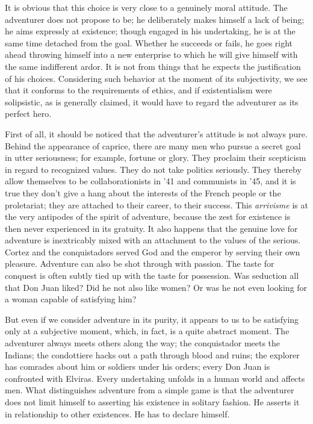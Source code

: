 \documentclass[11pt]{article}
\begin{document}
It is obvious that this choice is very close to a genuinely moral attitude. The adventurer does not propose to be; he deliberately makes himself a lack of being; he aims expressly at existence; though engaged in his undertaking, he is at the same time detached from the goal. Whether he succeeds or fails, he goes right ahead throwing himself into a new enterprise to which he will give himself with the same indifferent ardor. It is not from things that he expects the justification of his choices. Considering such behavior at the moment of its subjectivity, we see that it conforms to the requirements of ethics, and if existentialism were solipsistic, as is generally claimed, it would have to regard the adventurer as its perfect hero.

First of all, it should be noticed that the adventurer’s attitude is not always pure. Behind the appearance of caprice, there are many men who pursue a secret goal in utter seriousness; for example, fortune or glory. They proclaim their scepticism in regard to recognized values. They do not take politics seriously. They thereby allow themselves to be collaborationists in ’41 and communists in ’45, and it is true they don’t give a hang about the interests of the French people or the proletariat; they are attached to their career, to their success. This \textit{arrivisme} is at the very antipodes of the spirit of adventure, because the zest for existence is then never experienced in its gratuity. It also happens that the genuine love for adventure is inextricably mixed with an attachment to the values of the serious. Cortez and the conquistadors served God and the emperor by serving their own pleasure. Adventure can also be shot through with passion. The taste for conquest is often subtly tied up with the taste for possession. Was seduction all that Don Juan liked? Did he not also like women? Or was he not even looking for a woman capable of satisfying him?

But even if we consider adventure in its purity, it appears to us to be satisfying only at a subjective moment, which, in fact, is a quite abstract moment. The adventurer always meets others along the way; the conquistador meets the Indians; the condottiere hacks out a path through blood and ruins; the explorer has comrades about him or soldiers under his orders; every Don Juan is confronted with Elviras. Every undertaking unfolds in a human world and affects men. What distinguishes adventure from a simple game is that the adventurer does not limit himself to asserting his existence in solitary fashion. He asserts it in relationship to other existences. He has to declare himself.
\end{document}
